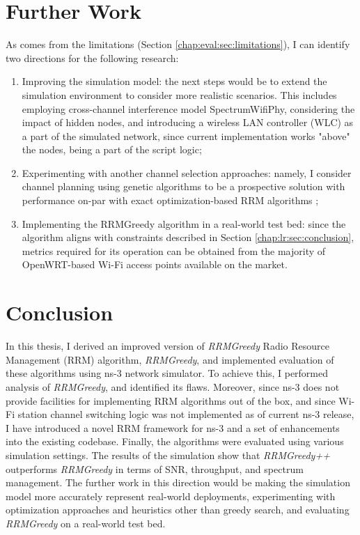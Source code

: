 \section{Further Work}
\label{chap:eval:sec:further_work}
As comes from the limitations (Section \ref{chap:eval:sec:limitations}), I can identify two directions for the following research:
\begin{enumerate}
    \item Improving the simulation model: the next steps would be to extend the simulation environment to consider more realistic scenarios. This includes employing cross-channel interference model SpectrumWifiPhy, considering the impact of hidden nodes, and introducing a wireless LAN controller (WLC) as a part of the simulated network, since current implementation works "above" the nodes, being a part of the script logic;
    \item Experimenting with another channel selection approaches: namely, I consider channel planning using genetic algorithms \cite{raschellaEvaluationChannelAssignment2019} to be a prospective solution with performance on-par with exact optimization-based RRM algorithms \cite{raschellaEvaluationChannelAssignment2019};
    \item Implementing the RRMGreedy algorithm in a real-world test bed: since the algorithm aligns with constraints described in Section \ref{chap:lr:sec:conclusion}, metrics required for its operation can be obtained from the majority of OpenWRT-based Wi-Fi access points available on the market.
\end{enumerate}

\section{Conclusion}
\label{chap:eval:sec:conclusion}
In this thesis, I derived an improved version of \textit{RRMGreedy} Radio Resource Management (RRM) algorithm, \textit{RRMGreedy}, and implemented evaluation of these algorithms using ns-3 network simulator.
To achieve this, I performed analysis of \textit{RRMGreedy}, and identified its flaws.
Moreover, since ns-3 does not provide facilities for implementing RRM algorithms out of the box, and since Wi-Fi station channel switching logic was not implemented as of current ns-3 release, I have introduced a novel RRM framework for ns-3 and a set of enhancements into the existing codebase.
Finally, the algorithms were evaluated using various simulation settings. The results of the simulation show that \textit{RRMGreedy++} outperforms \textit{RRMGreedy} in terms of SNR, throughput, and spectrum management. The further work in this direction would be making the simulation model more accurately represent real-world deployments, experimenting with optimization approaches and heuristics other than greedy search, and evaluating \textit{RRMGreedy} on a real-world test bed.